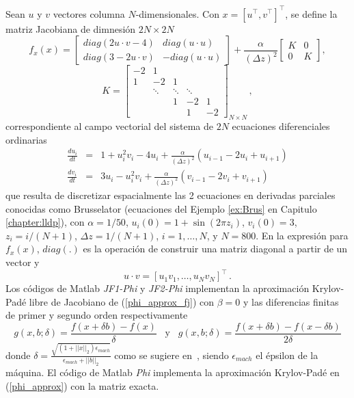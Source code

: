 	 Sean $u$ y $v$ vectores columna $N$-dimensionales. Con $x=[u^{\intercal}, v^{\intercal}]^{\intercal}$, se define la matriz Jacobiana de dimnesión $2N\times2N$
	\begin{equation} \label{ej:ej1-hpfj}
	f_{x}(x)=\left[
	\begin{array}{cc}
	diag(2u\cdot v-4) & diag(u\cdot u) \\
	diag(3-2u\cdot v) & -diag(u\cdot u)%
	\end{array}%
	\right] +\frac{\alpha }{(\Delta z)^{2}}\left[
	\begin{array}{cc}
	K & 0 \\
	0 & K%
	\end{array}%
	\right] ,
	\end{equation}
	\[
	K=\left[
	\begin{array}{ccccc}
	-2 & 1 &  &  & \\
	1 & -2 & 1 &  &  \\
	& \ddots  & \ddots  & \ddots  &  \\
	&  & 1 & -2 & 1 \\
	&  &  & 1 & -2%
	\end{array}%
	\right]_{N\times N} \, ,
	\]
	correspondiente al campo vectorial del sistema de $2N$ ecuaciones diferenciales ordinarias
	\begin{eqnarray*}
		\frac{du_{i}}{dt} &=&1+u_{i}^{2}v_{i}-4u_{i}+\frac{\alpha }{(\Delta z)^{2}}%
		(u_{i-1}-2u_{i}+u_{i+1}) \\
		\frac{dv_{i}}{dt} &=&3u_{i}-u_{i}^{2}v_{i}+\frac{\alpha }{(\Delta z)^{2}}%
		(v_{i-1}-2v_{i}+v_{i+1})
	\end{eqnarray*}
	que resulta de discretizar espacialmente las 2 ecuaciones en derivadas parciales conocidas como Brusselator (ecuaciones del Ejemplo \ref{ex:Brus} en Capitulo \ref{chapter:lldp}), con $\alpha =1/50$, $u_{i}(0)=1+\sin (2\pi z_{i})$, $v_{i}(0)=3$, $z_{i}=i/(N+1)$, $\Delta z =1/(N+1)$, $i=1,\ldots,N$, y $N=800$. En la expresión para $f_x(x)$, $diag(.)$ es la operación de construir una matriz diagonal a partir de un vector y
	\[  u \cdot v = [ u_1v_1, \ldots, u_Nv_N]^{\intercal}\, . \]
Los códigos de Matlab \textit{JF1-Phi} y \textit{JF2-Phi} implementan la aproximación Krylov-Padé libre de Jacobiano de (\ref{phi_approx_fj}) con $\beta=0$ y las diferencias finitas de primer y segundo orden respectivamente
\begin{equation}\label{finite-differences}
	g(x,b;\delta)=\frac{f(x+\delta b)-f(x)}{\delta}  \;\;\; \text{y} \;\;\; g(x,b;\delta)=\frac{f(x+\delta b)-f(x-\delta b)}{2\delta}
\end{equation}
donde $\delta= \frac{\sqrt{(1+||x||_2)\epsilon_{mach}}}{\epsilon_{mach}+||b||_2}$ como se sugiere en~\cite{knoll2004jacobian}, siendo $\epsilon_{mach}$ el épsilon de la máquina. El código de Matlab \textit{Phi} implementa la aproximación Krylov-Padé en (\ref{phi_approx}) con la matriz exacta.

